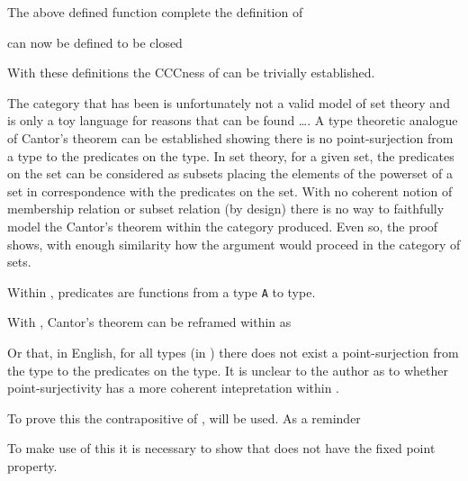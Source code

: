 The above defined function complete the definition of 


 can now be defined to be closed

With these definitions the CCCness of  can be trivially
established.

The category that has been is unfortunately not a valid model of set theory and
is only a toy language for reasons that can be found \ldots {}.
A type theoretic analogue of Cantor's theorem can be established showing there
is no point-surjection from a type to the predicates on the type. In set theory,
for a given set, the predicates on the set can be considered as subsets placing
the elements of the powerset of a set in correspondence with the predicates on
the set. With no coherent notion of membership relation or subset relation (by
design) there is no way to faithfully model the Cantor's theorem  within the
category produced. Even so, the proof shows, with enough similarity how the
argument would proceed in the category of sets.

Within , predicates are functions from a type \verb|A| to
 type.


With , Cantor's theorem can be reframed within
 as


Or that, in English, for all types (in ) there does not exist
a point-surjection from the type to the predicates on the type. It is unclear
to the author as to whether point-surjectivity has a more coherent intepretation
within .

To prove this  the contrapositive of
,  will be used. As a reminder


To make use of this it is necessary to show that  does not
have the fixed point property.


